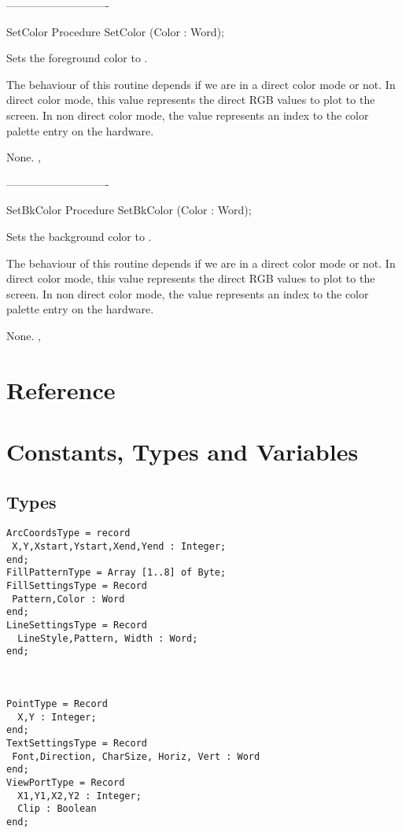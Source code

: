----------------------------
\begin{procedure}{SetColor}
\Declaration
Procedure SetColor (Color : Word);

\Description
Sets the foreground color to
.

The behaviour of this routine depends if we are in a direct color
mode or not. In direct color mode, this value represents the direct
RGB values to plot to the screen. In non direct color mode, the value
represents an index to the color palette entry on the hardware.

\Errors
None.
\SeeAlso
{}, 
\end{procedure}



----------------------------
\begin{procedure}{SetBkColor}
\Declaration
Procedure SetBkColor (Color : Word);

\Description
Sets the background color to
.

The behaviour of this routine depends if we are in a direct color
mode or not. In direct color mode, this value represents the direct
RGB values to plot to the screen. In non direct color mode, the value
represents an index to the color palette entry on the hardware.

\Errors
None.
\SeeAlso
{}, 
\end{procedure}


\section{Reference}




\section{Constants, Types and Variables}
\subsection{Types}
\begin{verbatim}
ArcCoordsType = record
 X,Y,Xstart,Ystart,Xend,Yend : Integer;
end;
FillPatternType = Array [1..8] of Byte;
FillSettingsType = Record
 Pattern,Color : Word
end;
LineSettingsType = Record
  LineStyle,Pattern, Width : Word;
end;



PointType = Record
  X,Y : Integer;
end;
TextSettingsType = Record
 Font,Direction, CharSize, Horiz, Vert : Word
end;
ViewPortType = Record
  X1,Y1,X2,Y2 : Integer;
  Clip : Boolean
end;
\end{verbatim}

